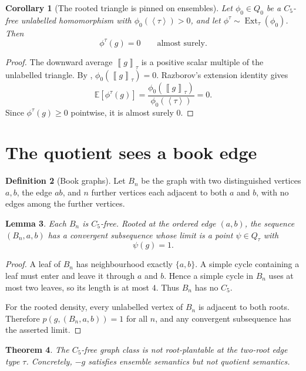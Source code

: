 \documentclass[11pt]{article}
\newtheorem{theorem}{Theorem}
\newtheorem{lemma}[theorem]{Lemma}
\newtheorem{corollary}[theorem]{Corollary}
\theoremstyle{definition}
\newtheorem{definition}[theorem]{Definition}
\newcommand{\Ext}{\operatorname{Ext}}
\newcommand{\brak}[1]{\left\langle #1\right\rangle}
\newcommand{\avg}[2]{\left\llbracket #1 \right\rrbracket_{#2}}
\begin{document}
\begin{corollary}[The rooted triangle is pinned on ensembles]\label{cor:pinned}
Let $\phi_0\in Q_0$ be a $C_5$-free unlabelled homomorphism with
$\phi_0(\brak{\tau})>0$, and let $\phi^\tau\sim\Ext_\tau(\phi_0)$.  Then
\[
  \phi^\tau(g)=0
  \qquad\text{almost surely.}
\]
\end{corollary}

\begin{proof}
The downward average $\avg{g}{\tau}$ is a positive scalar multiple of the
unlabelled triangle.  By ,
$\phi_0(\avg{g}{\tau})=0$.  Razborov's extension identity gives
\[
  \mathbb E[\phi^\tau(g)]
  =
  \frac{\phi_0(\avg{g}{\tau})}{\phi_0(\brak{\tau})}
  =0.
\]
Since $\phi^\tau(g)\ge0$ pointwise, it is almost surely $0$.
\end{proof}

\section{The quotient sees a book edge}

\begin{definition}[Book graphs]
Let $B_n$ be the graph with two distinguished vertices $a,b$, the edge $ab$,
and $n$ further vertices each adjacent to both $a$ and $b$, with no edges among
the further vertices.
\end{definition}

\begin{lemma}\label{lem:book-c5-free}
Each $B_n$ is $C_5$-free.  Rooted at the ordered edge $(a,b)$, the sequence
$(B_n,a,b)$ has a convergent subsequence whose limit is a point $\psi\in Q_\tau$
with
\[
  \psi(g)=1.
\]
\end{lemma}

\begin{proof}
A leaf of $B_n$ has neighbourhood exactly $\{a,b\}$.  A simple cycle containing
a leaf must enter and leave it through $a$ and $b$.  Hence a simple cycle in
$B_n$ uses at most two leaves, so its length is at most $4$.  Thus $B_n$ has no
$C_5$.

For the rooted density, every unlabelled vertex of $B_n$ is adjacent to both
roots.  Therefore $p(g,(B_n,a,b))=1$ for all $n$, and any convergent subsequence
has the asserted limit.
\end{proof}

\begin{theorem}\label{thm:c5-edge-not-root-plantable}
The $C_5$-free graph class is not root-plantable at the two-root edge type
$\tau$.  Concretely, $-g$ satisfies ensemble semantics but not quotient
semantics.
\end{theorem}
\end{document}

